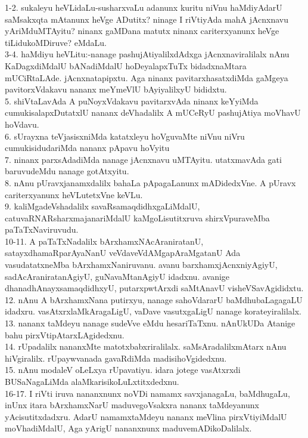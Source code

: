 \documentclass{article}
\begin{document}
1-2. sukaleyu heVLidaLu-susharxvaLu adanunx kuritu niVnu haMdiyAdarU saMsakxqta mAtanunx heVge ADutitx? ninage I riVtiyAda mahA jAcnxnavu yAriMduMTAyitu? ninanx gaMDana matutx ninanx cariterxyanunx heVge tiLidukoMDiruve? eMdaLu.\\
3-4. haMdiyu heVLitu:-nanage pashujAtiyalilxdAdxga jAcnxnaviralilalx nAnu KaDagxdiMdalU bANadiMdalU hoDeyalapxTuTx bidadxnaMtara mUCiRtaLAde. jAcnxnatapipxtu. Aga ninanx pavitarxhasatxdiMda gaMgeya pavitorxVdakavu nananx meYmeVlU bAyiyalilxyU bididxtu.\\
5. shiVtaLavAda A puNoyxVdakavu pavitarxvAda ninanx keYyiMda cumukisalapxDutatxlU nananx deVhadalilx A mUCeRyU pashujAtiya moVhavU hoVdavu.\\
6. sUrayxna teVjasisxniMda katatxleyu hoVguvaMte niVnu niVru cumukisidudariMda nananx pApavu hoVyitu\\
7. ninanx parxsAdadiMda nanage jAcnxnavu uMTAyitu. utatxmavAda gati baruvudeMdu nanage gotAtxyitu.\\
8. nAnu pUravxjanamxdalilx bahaLa pApagaLanunx mADidedxVne. A pUravx cariterxyanunx heVLutetxVne keVLu.\\
9. kaliMgadeVshadalilx savaRsamaqdidhxgaLiMdalU, catuvaRNARsharxmajanariMdalU kaMgoLisutitxruva shirxVpuraveMba paTaTxNaviruvudu.\\
10-11. A paTaTxNadalilx bArxhamxNAcAraniratanU, satayxdhamaRparAyaNanU veVdaveVdAMgapAraMgatanU Ada vasudatatxneMba bArxhamxNaniruvanu. avanu barxhamxjAcnxniyAgiyU, sadAcAraniratanAgiyU, guNavaMtanAgiyU idadxnu. avanige dhanadhAnayxsamaqdidhxyU, putarxpwtArxdi saMtAnavU visheVSavAgididxtu.\\
12. nAnu A bArxhamxNana putirxyu, nanage sahoVdararU baMdhubaLagagaLU idadxru. vasAtxrxlaMkAragaLigU, vaDave vasutxgaLigU nanage korateyiralilalx.\\
13. nananx taMdeyu nanage sudeVve eMdu hesariTaTxnu. nAnUkUDa Atanige bahu pirxVtipAtarxLAgidedxnu.\\
14. rUpadalilx nananxMte matotxbabxriralilalx. saMsAradalilxmAtarx nAnu hiVgiralilx. rUpaywvanada gavaRdiMda madisihoVgidedxnu.\\
15. nAnu modaleV oLeLxya rUpavatiyu. idara jotege vasAtxrxdi BUSaNagaLiMda alaMkarisikoLuLxtitxdedxnu.\\
16-17. I riVti iruva nananxnunx noVDi namamx savxjanagaLu, baMdhugaLu, inUnx itara bArxhamxNarU maduvegoVsakxra nananx taMdeyanunx yAcisutitxdadxru. AdarU namamxtaMdeyu nananx meVlina pirxVtiyiMdalU moVhadiMdalU, Aga yArigU nananxnunx maduvemADikoDalilalx.\\
\end{document}
